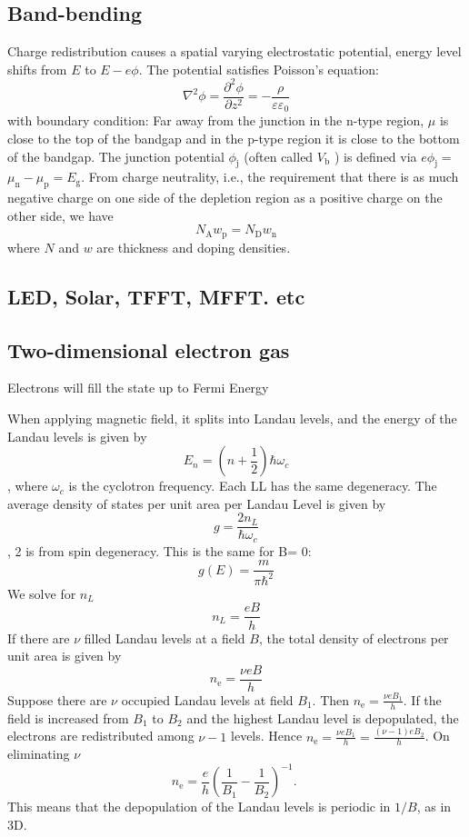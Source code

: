 \documentclass[12pt,a4paper]{article}
\begin{document}
\subsection{Band-bending}
Charge redistribution causes a spatial varying electrostatic potential, energy level shifts from $E$ to $E-e\phi$. The potential satisfies Poisson's equation:
$$
\nabla^2 \phi=\frac{\partial^2 \phi}{\partial z^2}=-\frac{\rho}{\varepsilon \varepsilon_0}
$$
with boundary condition: Far away from the junction in the n-type region, $\mu$ is close to the top of the bandgap and in the p-type region it is close to the bottom of the bandgap.
The junction potential $\phi_{\mathrm{j}}$ (often called $V_{\mathrm{b}}$ ) is defined via $e \phi_{\mathrm{j}}=$ $\mu_{\mathrm{n}}-\mu_{\mathrm{p}}=E_{\mathrm{g}}$. 
From charge neutrality, i.e., the requirement that there is as much negative charge on one side of the depletion region as a positive charge on the other side, we have
$$
N_{\mathrm{A}} w_{\mathrm{p}}=N_{\mathrm{D}} w_{\mathrm{n}}
$$
where $N$ and $w$ are thickness and doping densities.
\subsection{LED, Solar, TFFT, MFFT. etc}

\subsection{Two-dimensional electron gas}
Electrons will fill the state up to Fermi Energy

When applying magnetic field, it splits into Landau levels, and the energy of the Landau levels is given by
$$
E_{n}=\left(n+\frac{1}{2}\right) \hbar \omega_{c}
$$, where $\omega_c$ is the cyclotron frequency.
Each LL has the same degeneracy.
The average density of states per unit area per Landau Level is given by
$$
g = \frac{2n_L}{\hbar \omega_c}
$$, 2 is from spin degeneracy.
This is the same for B= 0:
$$
g(E) = \frac{m}{\pi \hbar^2}
$$
We solve for $n_L$
$$
n_L = \frac{e B}{h}
$$
If there are $\nu$ filled Landau levels at a field $B$, the total density of electrons per unit area is given by
$$
n_{\mathrm{e}}=\frac{\nu e B}{h}
$$
Suppose there are $\nu$ occupied Landau levels at field $B_1$. Then $n_{\mathrm{e}}=\frac{\nu e B_1}{h}$. If the field is increased from $B_1$ to $B_2$ and the highest Landau level is depopulated, the electrons are redistributed among $\nu-1$ levels. Hence $n_{\mathrm{e}}=\frac{\nu e B_1}{h}=\frac{(\nu-1) e B_2}{h}$. On eliminating $\nu$
$$
n_{\mathrm{e}}=\frac{e}{h}\left(\frac{1}{B_1}-\frac{1}{B_2}\right)^{-1} \text {. }
$$
This means that the depopulation of the Landau levels is periodic in $1 / B$, as in 3D.
\end{document}
